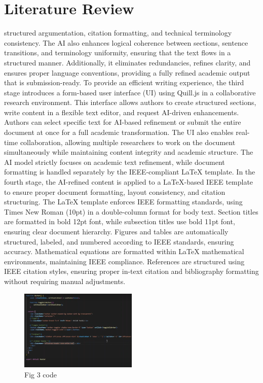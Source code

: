 \documentclass[conference]{IEEEtran}
\begin{document}
  \section{Literature Review}
  structured argumentation, citation formatting, and technical terminology consistency. The AI also enhances logical coherence between sections, sentence transitions, and terminology uniformity, ensuring that the text flows in a structured manner. Additionally, it eliminates redundancies, refines clarity, and ensures proper language conventions, providing a fully refined academic output that is submission-ready.
To provide an efficient writing experience, the third stage introduces a form-based user interface (UI) using Quill.js in a collaborative research environment. This interface allows authors to create structured sections, write content in a flexible text editor, and request AI-driven enhancements. Authors can select specific text for AI-based refinement or submit the entire document at once for a full academic transformation. The UI also enables real-time collaboration, allowing multiple researchers to work on the document simultaneously while maintaining content integrity and academic structure. The AI model strictly focuses on academic text refinement, while document formatting is handled separately by the IEEE-compliant LaTeX template.
In the fourth stage, the AI-refined content is applied to a LaTeX-based IEEE template to ensure proper document formatting, layout consistency, and citation structuring. The LaTeX template enforces IEEE formatting standards, using Times New Roman (10pt) in a double-column format for body text. Section titles are formatted in bold 12pt font, while subsection titles use bold 11pt font, ensuring clear document hierarchy. Figures and tables are automatically structured, labeled, and numbered according to IEEE standards, ensuring accuracy. Mathematical equations are formatted within LaTeX mathematical environments, maintaining IEEE compliance. References are structured using IEEE citation styles, ensuring proper in-text citation and bibliography formatting without requiring manual adjustments.

\begin{figure}[h]
\centering
\includegraphics[width=0.5\textwidth]{..//uploads/1740076455021.PNG}
\caption{Fig 3 code}
\end{figure}
\end{document}
